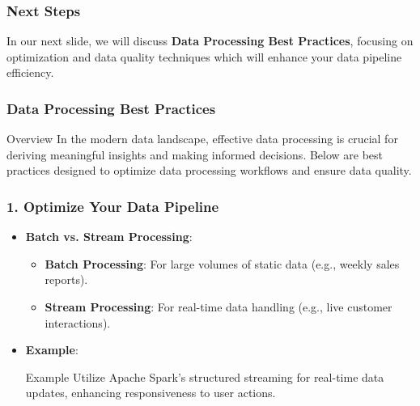 \documentclass[aspectratio=169]{beamer}
\begin{document}
\begin{frame}
    \frametitle{Next Steps}
    In our next slide, we will discuss \textbf{Data Processing Best Practices}, focusing on optimization and data quality techniques which will enhance your data pipeline efficiency.
\end{frame}

\begin{frame}
    \frametitle{Data Processing Best Practices}
    \begin{block}{Overview}
        In the modern data landscape, effective data processing is crucial for deriving meaningful insights and making informed decisions. Below are best practices designed to optimize data processing workflows and ensure data quality.
    \end{block}
\end{frame}

\begin{frame}[fragile]
    \frametitle{1. Optimize Your Data Pipeline}
    \begin{itemize}
        \item \textbf{Batch vs. Stream Processing}:
            \begin{itemize}
                \item \textbf{Batch Processing}: For large volumes of static data (e.g., weekly sales reports).
                \item \textbf{Stream Processing}: For real-time data handling (e.g., live customer interactions).
            \end{itemize}
        \item \textbf{Example}:
            \begin{block}{Example}
                Utilize Apache Spark's structured streaming for real-time data updates, enhancing responsiveness to user actions.
            \end{block}
    \end{itemize}
\end{frame}
\end{document}
